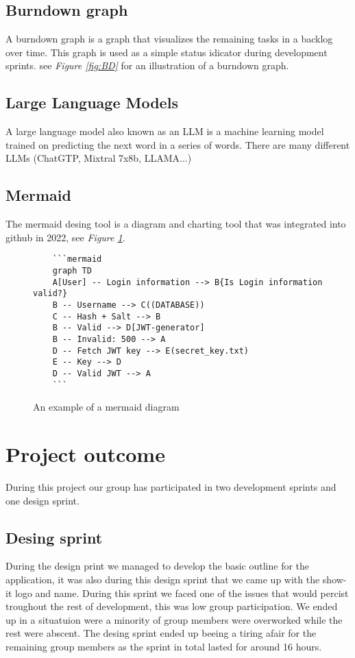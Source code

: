 \documentclass[12pt]{article}
\begin{document}
\subsection{Burndown graph\cite{BurndownChart2024}}
A burndown graph is a graph that visualizes the remaining tasks in a backlog over time.
This graph is used as a simple status idicator during development sprints.
see \textit{Figure \ref{fig:BD}} for an illustration of a burndown graph.
\subsection{Large Language Models\cite{aiMixtralExperts2023}}
A large language model also known as an LLM is a machine learning model trained on predicting the next word in a series of words.
There are many different LLMs (ChatGTP, Mixtral 7x8b, LLAMA...)
\subsection{Mermaid\cite{MermaidDiagrammingCharting}}
The mermaid desing tool is a diagram and charting tool that was integrated into github in 2022, see \textit{Figure \ref{fig:MM}}.
\begin{figure}[h]
    \begin{verbatim}
    ```mermaid
    graph TD
    A[User] -- Login information --> B{Is Login information valid?}
    B -- Username --> C((DATABASE))
    C -- Hash + Salt --> B
    B -- Valid --> D[JWT-generator]
    B -- Invalid: 500 --> A
    D -- Fetch JWT key --> E(secret_key.txt)
    E -- Key --> D
    D -- Valid JWT --> A
    ```
    \end{verbatim}
    \caption{An example of a mermaid diagram}
    \label{fig:MM}
\end{figure}

\section{Project outcome}
During this project our group has participated in two development sprints and one design sprint.
\subsection{Desing sprint}
During the design print we managed to develop the basic outline for the application, it was also during this
design sprint that we came up with the show-it logo and name. During this sprint we faced one of the issues that would 
percist troughout the rest of development, this was low group participation.
We ended up in a situatuion were a minority of group members were overworked while the rest were abscent.
The desing sprint ended up beeing a tiring afair for the remaining group members as the sprint in total lasted for around 16 hours.
\end{document}

